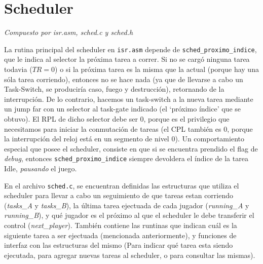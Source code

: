 \documentclass{article}
\begin{document}
	\section{Scheduler}
	\vspace{-1cm}
	\begin{flushright}
	\textit{Compuesto por isr.asm, sched.c y sched.h}
	\end{flushright}

    La rutina principal del scheduler en \texttt{isr.asm} depende de
    \texttt{sched\_proximo\_indice}, que le indica al selector la próxima tarea a correr. Si no se
    cargó ninguna tarea todavia ($TR = 0$) o si la próxima tarea es la misma que la actual (porque
    hay una sóla tarea corriendo), entonces no se hace nada (ya que de llevarse a cabo un
    Task-Switch, se produciría caso, fuego y destrucción), retornando de la interrupción. De lo
    contrario, hacemos un task-switch a la nueva tarea mediante un jump far con un selector al
    task-gate indicado (el `próximo índice' que se obtuvo). El RPL de dicho selector debe ser 0, porque es
    el privilegio que necesitamos para iniciar la conmutación de tareas (el CPL también es 0, porque
    la interrupción del reloj está en un segmento de nivel 0). Un comportamiento especial que posee
    el scheduler, consiste en que si se encuentra prendido el flag de \textit{debug}, entonces 
    \texttt{sched\_proximo\_indice} siempre devoldera el índice de la tarea Idle, \textit{pausando}
    el juego.

	En el archivo \texttt{sched.c}, se encuentran definidas las estructuras que utiliza el scheduler
    para llevar a cabo un seguimiento de que tareas estan corriendo (\textit{tasks\_A} y
    \textit{tasks\_B}), la última tarea ejectuada de cada jugador (\textit{running\_A} y
    \textit{running\_B}), y qué jugador es el próximo al que el scheduler le debe transferir el
    control (\textit{next\_player}). También contiene las runtinas que indican cuál es la siguiente
    tarea a ser ejectuada (mencionada anteriormente), y funciones de interfaz con las estructuras
    del mismo (Para indicar qué tarea esta siendo ejecutada, para agregar nuevas tareas al
    scheduler, o para consultar las mismas).


\end{document}
